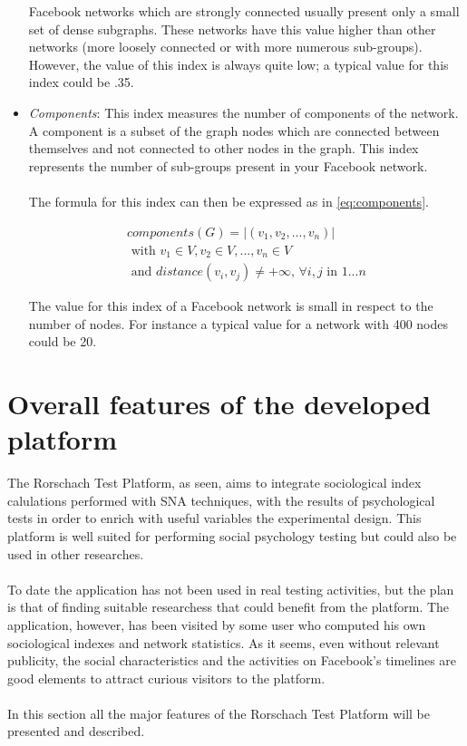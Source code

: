 \begin{itemize}
Facebook networks which are strongly connected usually present only a small set of dense subgraphs.
These networks have this value higher than other networks (more loosely connected or with more numerous sub-groups).
However, the value of this index is always quite low; a typical value for this index could be .35.

\item \emph{Components}: This index measures the number of components of the network.
A component is a subset of the graph nodes which are connected between themselves and not connected to other nodes in the graph.
This index represents the number of sub-groups present in your Facebook network.\\
\\
The formula for this index can then be expressed as in \ref{eq:components}.

\begin{equation}
\begin{split}
components(G) = \left | (v_{1}, v_{2}, ..., v_{n}) \right |\\
\textrm{ with } v_{1} \in V, v_{2} \in V, ..., v_{n} \in V \\
\textrm{ and } distance(v_{i}, v_{j}) \neq +\infty \textrm{, }
\forall i, j \textrm{ in } 1...n
\end{split}
\label{eq:compoents}
\end{equation}

The value for this index of a Facebook network is small in respect to the number of nodes.
For instance a typical value for a network with 400 nodes could be 20.
\end{itemize}

\label{sec:overallfeatures}
\section{Overall features of the developed platform}
The Rorschach Test Platform, as seen, aims to integrate sociological index calulations performed with SNA techniques, with the results of psychological tests in order to
enrich with useful variables the experimental design.
This platform is well suited for performing social psychology testing but could also be used in other researches.\\
\\
To date the application has not been used in real testing activities, but the plan is that of finding suitable researchess that could benefit from the platform.
The application, however, has been visited by some user who computed his own sociological indexes and network statistics.
As it seems, even without relevant publicity, the social characteristics and the activities on Facebook's timelines are good elements to attract curious visitors to
the platform.\\
\\
In this section all the major features of the Rorschach Test Platform will be presented and described.

